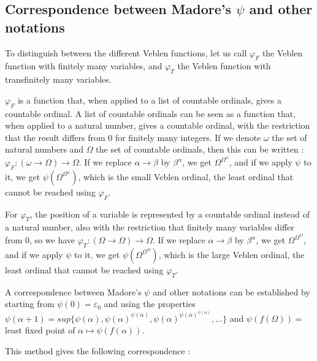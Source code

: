 \documentclass[10pt]{article}
\begin{document}
\subsection{Correspondence between Madore's \( \psi \) and other notations}

To distinguish between the different Veblen functions, let us call \( \varphi_F \) the Veblen function with finitely many variables, and \( \varphi_T \) the Veblen function with transfinitely many variables.

\( \varphi_F \) is a function that, when applied to a list of countable ordinals, gives a countable ordinal. A list of countable ordinals can be seen as a function that, when applied to a natural number, gives a countable ordinal, with the restriction that the result differs from 0 for finitely many integers. If we denote \( \omega \) the set of natural numbers and \( \Omega \) the set of countable ordinals, then this can be written : \( \varphi_F : (\omega \rightarrow \Omega) \rightarrow \Omega \). If we replace \( \alpha \rightarrow \beta \) by \( \beta^\alpha \), we get \( \Omega^{\Omega^\omega} \), and if we apply \( \psi \) to it, we get \( \psi(\Omega^{\Omega^\omega}) \), which is the small Veblen ordinal, the least ordinal that cannot be reached using \( \varphi_F \).

For \( \varphi_T \), the position of a variable is represented by a countable ordinal instead of a natural number, also with the restriction that finitely many variables differ from 0, so we have \( \varphi_T : (\Omega \rightarrow \Omega) \rightarrow \Omega \). If we replace \( \alpha \rightarrow \beta \) by \( \beta^\alpha \), we get \( \Omega^{\Omega^\Omega} \), and if we apply \( \psi \) to it, we get \( \psi(\Omega^{\Omega^\Omega}) \), which is the large Veblen ordinal, the least ordinal that cannot be reached using \( \varphi_T \).

\bigskip

A correspondence between Madore's \( \psi \) and other notations can be established by starting from \( \psi(0) = \varepsilon_0 \) and using the properties \( \psi(\alpha+1) = sup \lbrace \psi(\alpha), \psi(\alpha)^{\psi(\alpha)}, \psi(\alpha)^{\psi(\alpha)^{\psi(\alpha)}}, \ldots \rbrace \) and \( \psi(f(\Omega)) = \) least fixed point of \( \alpha \mapsto \psi(f(\alpha)) \).

This method gives the following correspondence :
\end{document}
